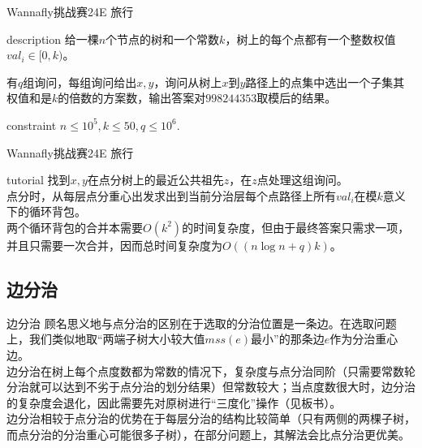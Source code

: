 \documentclass{beamer}
\begin{document}
\begin{frame}{Wannafly挑战赛24E 旅行}
\begin{block}{description}
	给一棵$n$个节点的树和一个常数$k$，树上的每个点都有一个整数权值$val_i\in[0,k)$。
	
	有$q$组询问，每组询问给出$x,y$，询问从树上$x$到$y$路径上的点集中选出一个子集其权值和是$k$的倍数的方案数，输出答案对$998244353$取模后的结果。
\end{block}
\begin{block}{constraint}
	$n \le 10^5, k \le 50, q \le 10^6.$
\end{block}
\end{frame}
\begin{frame}{Wannafly挑战赛24E 旅行}
\begin{block}{tutorial}
	找到$x,y$在点分树上的最近公共祖先$z$，在$z$点处理这组询问。\\
	
	点分时，从每层点分重心出发求出到当前分治层每个点路径上所有$val_i$在模$k$意义下的循环背包。\\
	
	两个循环背包的合并本需要$O(k^2)$的时间复杂度，但由于最终答案只需求一项，并且只需要一次合并，因而总时间复杂度为$O((n\log n+q)k)$。
\end{block}
\end{frame}

\subsection{边分治}
\begin{frame}{边分治}
	顾名思义地与点分治的区别在于选取的分治位置是一条边。在选取问题上，我们类似地取“两端子树大小较大值$mss(e)$最小”的那条边$e$作为分治重心边。\\
	
	边分治在树上每个点度数都为常数的情况下，复杂度与点分治同阶（只需要常数轮分治就可以达到不劣于点分治的划分结果）但常数较大；当点度数很大时，边分治的复杂度会退化，因此需要先对原树进行“三度化”操作（见板书）。\\
	
	边分治相较于点分治的优势在于每层分治的结构比较简单（只有两侧的两棵子树，而点分治的分治重心可能很多子树），在部分问题上，其解法会比点分治更优美。
\end{frame}
\end{document}

